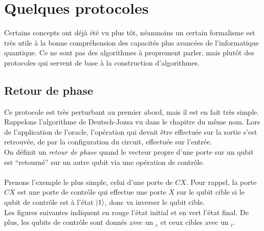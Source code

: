\chapter{Quelques protocoles}\label{ch:quelques-protocoles}

Certains concepts ont déjà été vu plus tôt, néanmoins un certain formalisme est
très utile à la bonne compréhension des capacités plus avancées de l'informatique
quantique.
Ce ne sont pas des algorithmes à proprement parler, mais plutôt des protocoles
qui servent de base à la construction d'algorithmes.

\section{Retour de phase}\label{sec:retour-de-phase}

Ce protocole est très perturbant au premier abord, mais il est en fait très
simple.
Rappelons l'algorithme de Deutsch-Jozsa vu dans le chapitre du même nom.
Lors de l'application de l'oracle, l'opération qui devait être effectuée sur la
sortie s'est retrouvée, de par la configuration du circuit, effectuée sur
l'entrée.\\
On définit un \textit{retour de phase} quand le vecteur propre d'une porte sur un qubit
est ``retourné'' sur un autre qubit via une opération de contrôle.\\ \\
Prenons l'exemple le plus simple, celui d'une porte de $CX$.
Pour rappel, la porte $CX$ est une porte de contrôle qui effectue une porte $X$
sur le qubit cible si le qubit de contrôle est à l'état $\ket{1}$, donc va inverser
le qubit cible.\\
Les figures suivantes indiquent en rouge l'état initial et en vert l'état
final.
De plus, les qubits de contrôle sont donnés avec un $_c$ et ceux cibles avec un
$_t$.

